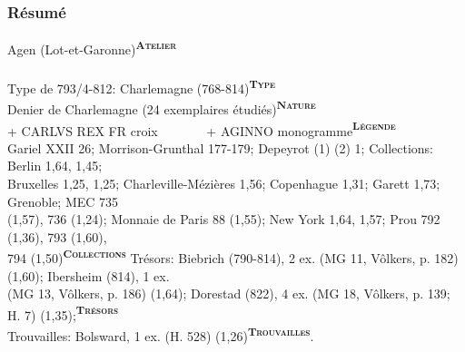 \documentclass[10pt, compress]{beamer}
\newcommand{\up}[1]{\textsuperscript{\textbf{\textsc{#1}}}}
\begin{document}
\begin{frame}[fragile]
  \frametitle{Résumé}
  \begin{scriptsize}
Agen (Lot-et-Garonne)\alert{\up{Atelier}}\\~\\
Type de 793/4-812: Charlemagne (768-814)\alert{\up{Type}}\\
Denier de Charlemagne (24 exemplaires étudiés)\alert{\up{Nature}}\\
+ CARLVS REX FR croix~~~~~~~ + AGINNO monogramme\alert{\up{Légende}}\\
Gariel XXII 26; Morrison-Grunthal 177-179; Depeyrot (1) (2) 1;
Collections: Berlin 1,64, 1,45; \\
Bruxelles 1,25, 1,25; Charleville-Mézières 1,56; Copenhague 1,31; Garett 1,73; Grenoble; MEC 735 \\
(1,57), 736 (1,24); Monnaie de Paris 88 (1,55); New York 1,64, 1,57; Prou 792 (1,36), 793 (1,60), \\
794 (1,50)\alert{\up{Collections}} Trésors: Biebrich (790-814), 2 ex. (MG 11, Vôlkers, p. 182) (1,60); Ibersheim (814), 1 ex. \\
(MG 13, Vôlkers, p. 186) (1,64); Dorestad (822), 4 ex. (MG 18, Vôlkers, p. 139; H. 7) (1,35);\alert{\up{Trésors}} \\
Trouvailles: Bolsward, 1 ex. (H. 528) (1,26)\alert{\up{Trouvailles}}.
    \end{scriptsize}
\end{frame}
\end{document}
